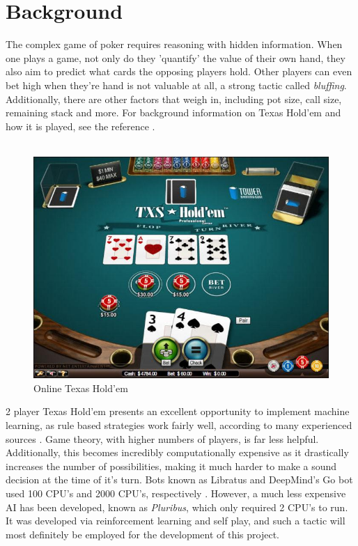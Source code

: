 \documentclass[12pt]{article}
\begin{document}
\section{Background}
The complex game of poker requires reasoning with hidden information. When one plays a game, not only do they 'quantify' the value of their own hand, they also aim to predict what cards the opposing players hold. Other players can even bet high when they're hand is not valuable at all, a strong tactic called \textit{bluffing}. Additionally, there are other factors that weigh in, including pot size, call size, remaining stack and more. For background information on Texas Hold'em and how it is played, see the reference \cite{tex}.\\\\
\begin{figure}[H]
    \centering
    \includegraphics[width=.70\linewidth]{figures/texas.jpg}
    \caption{Online Texas Hold'em}
    \label{fig:tex}
\end{figure}
2 player Texas Hold'em presents an excellent opportunity to implement machine learning, as rule based strategies work fairly well, according to many experienced sources \cite{ai}. Game theory, with higher numbers of players, is far less helpful. Additionally, this becomes incredibly computationally expensive as it drastically increases the number of possibilities, making it much harder to make a sound decision at the time of it's turn. Bots known as Libratus and DeepMind's Go bot used 100 CPU's and 2000 CPU's, respectively \cite{ai}. However, a much less expensive AI has been developed, known as \textit{Pluribus}, which only required 2 CPU's to run. It was developed via reinforcement learning and self play, and such a tactic will most definitely be employed for the development of this project. 
\end{document}
